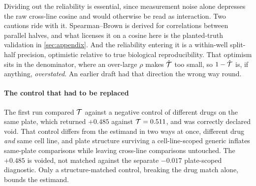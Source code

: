 Dividing out the reliability is essential, since measurement noise alone
depresses the raw cross-line cosine and would otherwise be read as interaction.
Two cautions ride with it. Spearman--Brown is derived for correlations between
parallel halves, and what licenses it on a cosine here is the planted-truth
validation in \cref{sec:appendix}. And the reliability entering it is a
within-well split-half precision, optimistic relative to true biological
reproducibility. That optimism sits in the denominator, where an over-large
$\rho$ makes $\hat{\mathcal{T}}$ too small, so $1 - \hat{\mathcal{T}}$ is, if anything,
\emph{overstated}. An earlier draft had that direction the wrong way round.

\paragraph{The control that had to be replaced} The first run compared $\mathcal{T}$
against a negative control of different drugs on the same plate, which returned
$+0.485$ against $\mathcal{T} = 0.511$, and was correctly declared
void. That control differs from the estimand in
two ways at once, different drug \emph{and} same cell line, and plate structure
surviving a cell-line-scoped generic inflates same-plate comparisons while
leaving cross-line comparisons untouched. The $+0.485$ is voided, not matched
against the separate $-0.017$ plate-scoped diagnostic. Only a structure-matched
control, breaking the drug match alone, bounds the estimand.


